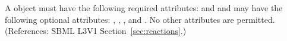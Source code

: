 A \SpeciesReference object must have the following required attributes: 
 and 
and may have the following optional attributes:
, , ,  and 
.  No other attributes are permitted.  
(References: SBML L3V1 Section~\ref{sec:reactions}.)
